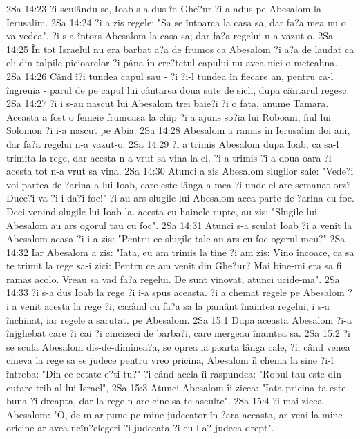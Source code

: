 2Sa 14:23  ?i sculându-se, Ioab s-a dus în Ghe?ur ?i a adus pe Abesalom la Ierusalim.
2Sa 14:24  ?i a zis regele: "Sa se întoarca la casa sa, dar fa?a mea nu o va vedea". ?i s-a întors Abesalom la casa sa; dar fa?a regelui n-a vazut-o.
2Sa 14:25  În tot Israelul nu era barbat a?a de frumos ca Abesalom ?i a?a de laudat ca el; din talpile picioarelor ?i pâna în cre?tetul capului nu avea nici o meteahna.
2Sa 14:26  Când î?i tundea capul sau - ?i ?i-l tundea în fiecare an, pentru ca-l îngreuia - parul de pe capul lui cântarea doua sute de sicli, dupa cântarul regesc.
2Sa 14:27  ?i i s-au nascut lui Abesalom trei baie?i ?i o fata, anume Tamara. Aceasta a fost o femeie frumoasa la chip ?i a ajuns so?ia lui Roboam, fiul lui Solomon ?i i-a nascut pe Abia.
2Sa 14:28  Abesalom a ramas în Ierusalim doi ani, dar fa?a regelui n-a vazut-o.
2Sa 14:29  ?i a trimis Abesalom dupa Ioab, ca sa-l trimita la rege, dar acesta n-a vrut sa vina la el. ?i a trimis ?i a doua oara ?i acesta tot n-a vrut sa vina.
2Sa 14:30  Atunci a zis Abesalom slugilor sale: "Vede?i voi partea de ?arina a lui Ioab, care este lânga a mea ?i unde el are semanat orz? Duce?i-va ?i-i da?i foc!" ?i au ars slugile lui Abesalom acea parte de ?arina cu foc. Deci venind slugile lui Ioab la. acesta cu hainele rupte, au zis: "Slugile lui Abesalom au ars ogorul tau cu foc".
2Sa 14:31  Atunci s-a sculat Ioab ?i a venit la Abesalom acasa ?i i-a zis: "Pentru ce slugile tale au ars cu foc ogorul meu?"
2Sa 14:32  Iar Abesalom a zis: "Iata, eu am trimis la tine ?i am zis: Vino încoace, ca sa te trimit la rege sa-i zici: Pentru ce am venit din Ghe?ur? Mai bine-mi era sa fi ramas acolo. Vreau sa vad fa?a regelui. De sunt vinovat, atunci ucide-ma".
2Sa 14:33  ?i s-a dus Ioab la rege ?i i-a spus aceasta. ?i a chemat regele pe Abesalom ?i a venit acesta la rege ?i, cazând cu fa?a sa la pamânt înaintea regelui, i s-a închinat, iar regele a sarutat. pe Abesalom.
2Sa 15:1  Dupa aceasta Abesalom ?i-a înjghebat care ?i cai ?i cincizeci de barba?i, care mergeau înaintea sa.
2Sa 15:2  ?i se scula Abesalom dis-de-diminea?a, se oprea la poarta lânga cale, ?i, când venea cineva la rege sa se judece pentru vreo pricina, Abesalom îl chema la sine ?i-l întreba: "Din ce cetate e?ti tu?" ?i când acela îi raspundea: "Robul tau este din cutare trib al lui Israel",
2Sa 15:3  Atunci Abesalom îi zicea: "Iata pricina ta este buna ?i dreapta, dar la rege n-are cine sa te asculte".
2Sa 15:4  ?i mai zicea Abesalom: "O, de m-ar pune pe mine judecator în ?ara aceasta, ar veni la mine oricine ar avea neîn?elegeri ?i judecata ?i eu l-a? judeca drept".
